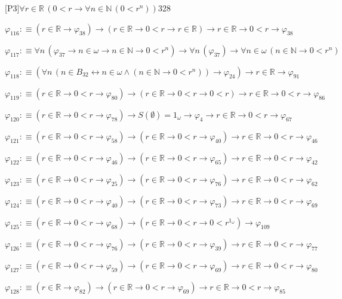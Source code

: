 \begin{fullproof}{[P3]}{$\forall r \in \mathbb{R}\,(0 < r \to \forall n \in \mathbb{N}\,(0 < {{r}^{n}}))$}{328}
\begin{abbrevlist}
\item $\varphi_{116} :\equiv (r \in \mathbb{R} \to \varphi_{38}) \to (r \in \mathbb{R} \to 0 < r \to r \in \mathbb{R}) \to r \in \mathbb{R} \to 0 < r \to \varphi_{38}$
\item $\varphi_{117} :\equiv \forall n\,(\varphi_{37} \to n \in \omega \to n \in \mathbb{N} \to 0 < {{r}^{n}}) \to \forall n\,(\varphi_{37}) \to \forall n \in \omega\,(n \in \mathbb{N} \to 0 < {{r}^{n}})$
\item $\varphi_{118} :\equiv (\forall n\,(n \in B_{32} \leftrightarrow n \in \omega \land (n \in \mathbb{N} \to 0 < {{r}^{n}})) \to \varphi_{24}) \to r \in \mathbb{R} \to \varphi_{91}$
\item $\varphi_{119} :\equiv (r \in \mathbb{R} \to 0 < r \to \varphi_{80}) \to (r \in \mathbb{R} \to 0 < r \to 0 < r) \to r \in \mathbb{R} \to 0 < r \to \varphi_{86}$
\item $\varphi_{120} :\equiv (r \in \mathbb{R} \to 0 < r \to \varphi_{78}) \to S(\emptyset) = 1_{\omega} \to \varphi_{4} \to r \in \mathbb{R} \to 0 < r \to \varphi_{67}$
\item $\varphi_{121} :\equiv (r \in \mathbb{R} \to 0 < r \to \varphi_{58}) \to (r \in \mathbb{R} \to 0 < r \to \varphi_{40}) \to r \in \mathbb{R} \to 0 < r \to \varphi_{46}$
\item $\varphi_{122} :\equiv (r \in \mathbb{R} \to 0 < r \to \varphi_{46}) \to (r \in \mathbb{R} \to 0 < r \to \varphi_{65}) \to r \in \mathbb{R} \to 0 < r \to \varphi_{42}$
\item $\varphi_{123} :\equiv (r \in \mathbb{R} \to 0 < r \to \varphi_{25}) \to (r \in \mathbb{R} \to 0 < r \to \varphi_{76}) \to r \in \mathbb{R} \to 0 < r \to \varphi_{62}$
\item $\varphi_{124} :\equiv (r \in \mathbb{R} \to 0 < r \to \varphi_{40}) \to (r \in \mathbb{R} \to 0 < r \to \varphi_{73}) \to r \in \mathbb{R} \to 0 < r \to \varphi_{69}$
\item $\varphi_{125} :\equiv (r \in \mathbb{R} \to 0 < r \to \varphi_{68}) \to (r \in \mathbb{R} \to 0 < r \to 0 < {{r}^{1_{\omega}}}) \to \varphi_{109}$
\item $\varphi_{126} :\equiv (r \in \mathbb{R} \to 0 < r \to \varphi_{76}) \to (r \in \mathbb{R} \to 0 < r \to \varphi_{39}) \to r \in \mathbb{R} \to 0 < r \to \varphi_{77}$
\item $\varphi_{127} :\equiv (r \in \mathbb{R} \to 0 < r \to \varphi_{59}) \to (r \in \mathbb{R} \to 0 < r \to \varphi_{69}) \to r \in \mathbb{R} \to 0 < r \to \varphi_{80}$
\item $\varphi_{128} :\equiv (r \in \mathbb{R} \to \varphi_{82}) \to (r \in \mathbb{R} \to 0 < r \to \varphi_{69}) \to r \in \mathbb{R} \to 0 < r \to \varphi_{85}$

\end{abbrevlist}
\end{fullproof}
